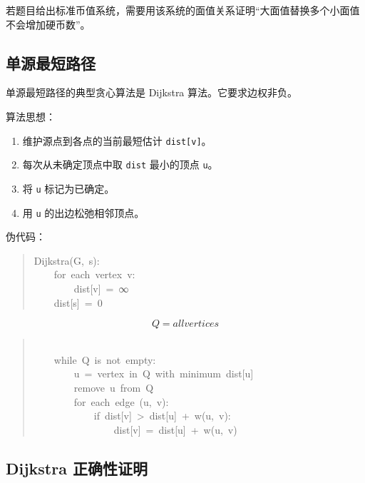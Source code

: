 \documentclass[UTF8,zihao=-4]{ctexart}
\begin{document}
若题目给出标准币值系统，需要用该系统的面值关系证明“大面值替换多个小面值不会增加硬币数”。

\subsection*{单源最短路径}

单源最短路径的典型贪心算法是 Dijkstra 算法。它要求边权非负。

算法思想：

\begin{enumerate}
\item 维护源点到各点的当前最短估计 \texttt{dist[v]}。
\item 每次从未确定顶点中取 \texttt{dist} 最小的顶点 \texttt{u}。
\item 将 \texttt{u} 标记为已确定。
\item 用 \texttt{u} 的出边松弛相邻顶点。
\end{enumerate}

伪代码：

\begin{quote}
\small\ttfamily\raggedright
\relax Dijkstra(G,\ s):\\
\relax \ \ \ \ for\ each\ vertex\ v:\\
\relax \ \ \ \ \ \ \ \ dist[v]\ =\ ∞\\
\relax \ \ \ \ dist[s]\ =\ 0\\
\end{quote}
\[Q = all vertices\]
\begin{quote}
\small\ttfamily\raggedright
\mbox{}\\
\relax \ \ \ \ while\ Q\ is\ not\ empty:\\
\relax \ \ \ \ \ \ \ \ u\ =\ vertex\ in\ Q\ with\ minimum\ dist[u]\\
\relax \ \ \ \ \ \ \ \ remove\ u\ from\ Q\\
\relax \ \ \ \ \ \ \ \ for\ each\ edge\ (u,\ v):\\
\relax \ \ \ \ \ \ \ \ \ \ \ \ if\ dist[v]\ >\ dist[u]\ +\ w(u,\ v):\\
\relax \ \ \ \ \ \ \ \ \ \ \ \ \ \ \ \ dist[v]\ =\ dist[u]\ +\ w(u,\ v)\\
\end{quote}

\subsection*{Dijkstra 正确性证明}
\end{document}
